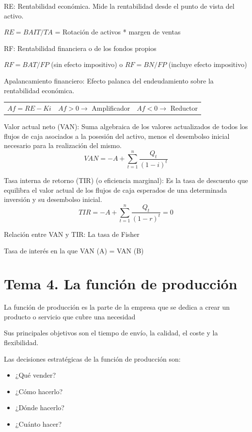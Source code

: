 \documentclass[12pt, twoside, openright]{report} %
\begin{document}
RE: Rentabilidad económica. Mide la rentabilidad desde el punto de vista del activo.

$RE = BAIT / TA$ = Rotación de activos * margen de ventas

RF: Rentabilidad financiera o de los fondos propios

$RF = BAT / FP$ (sin efecto impositivo) o $RF = BN / FP$ (incluye efecto impositivo)

Apalancamiento financiero: Efecto palanca del endeudamiento sobre la rentabilidad económica.
\begin{table}[H]
	\begin{tabular}{lll}
		$Af = RE - Ki$ & $Af > 0 \rightarrow$ Amplificador & $Af < 0 \rightarrow$ Reductor
	\end{tabular}
\end{table}


Valor actual neto (VAN): Suma algebraica de los valores actualizados de todos los flujos de caja asociados a
la posesión del activo, menos el desembolso inicial necesario para la realización del mismo.
$$VAN = -A + \sum\limits_{t=1}^n \frac{Q_t}{(1-i)^t}$$

Tasa interna de retorno (TIR) (o eficiencia marginal): Es la tasa de descuento que equilibra el valor actual de
los flujos de caja esperados de una determinada inversión y su desembolso inicial.
$$TIR = -A + \sum\limits_{t=1}^n \frac{Q_t}{(1-r)^t}=0$$

Relación entre VAN y TIR: La tasa de Fisher

Tasa de interés en la que VAN (A) = VAN (B)



\chapter{Tema 4. La función de producción}
La función de producción es la parte de la empresa que se dedica a crear un producto o servicio que cubre una necesidad

Sus principales objetivos son el tiempo de envío, la calidad, el coste y la flexibilidad.

Las decisiones estratégicas de la función de producción son:
\begin{itemize}
	\item ¿Qué vender?
	\item ¿Cómo hacerlo?
	\item ¿Dónde hacerlo?
	\item ¿Cuánto hacer?
\end{itemize}
\end{document}
